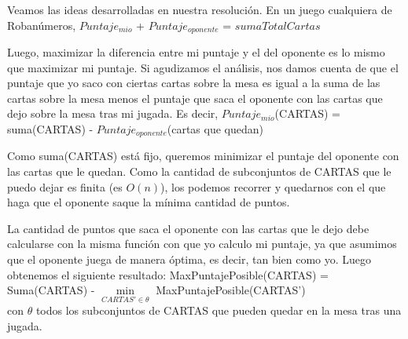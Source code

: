 \documentclass[11pt, a4paper, twoside]{article}
\begin{document}
{}

Veamos las ideas desarrolladas en nuestra resolución. En un juego cualquiera de Robanúmeros, $Puntaje_{mio}$ + $Puntaje_{oponente}$ = $sumaTotalCartas$

Luego, maximizar la diferencia entre mi puntaje y el del oponente es lo mismo que maximizar mi puntaje. Si agudizamos el análisis, nos damos cuenta de que el puntaje que yo saco con ciertas cartas sobre la mesa es igual a la suma de las cartas sobre la mesa menos el puntaje que saca el oponente con las cartas que dejo sobre la mesa tras mi jugada. Es decir,
$Puntaje_{mio}$(CARTAS) = suma(CARTAS) - $Puntaje_{oponente}$(cartas que quedan)

Como suma(CARTAS) está fijo, queremos minimizar el puntaje del oponente con las cartas que le quedan. Como la cantidad de subconjuntos de CARTAS que le puedo dejar es finita (es $O(n)$), los podemos recorrer y quedarnos con el que haga que el oponente saque la mínima cantidad de puntos. 

La cantidad de puntos que saca el oponente con las cartas que le dejo debe calcularse con la misma función con que yo calculo mi puntaje, ya que asumimos que el oponente juega de manera óptima, es decir, tan bien como yo. Luego obtenemos el siguiente resultado:
MaxPuntajePosible(CARTAS) = Suma(CARTAS) - $\min\limits_{CARTAS' \in \theta}$ 
MaxPuntajePosible(CARTAS')
\\con $\theta$ todos los subconjuntos de CARTAS que pueden quedar en la mesa tras una jugada.

\end{document}
